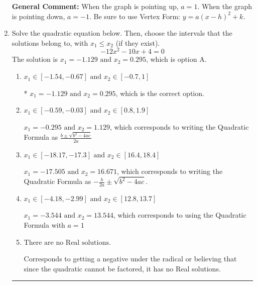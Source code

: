 \documentclass{extbook}[14pt]
\newcommand{\litem}[1]{\item #1

\rule{\textwidth}{0.4pt}}
\begin{document}
\begin{enumerate}
{\textbf{General Comment:} When the graph is pointing up, $a=1$. When the graph is pointing down, $a=-1$. Be sure to use Vertex Form: $y = a(x-h)^2+k$.
}
\litem{
Solve the quadratic equation below. Then, choose the intervals that the solutions belong to, with $x_1 \leq x_2$ (if they exist).
\[ -12x^{2} -10 x + 4 = 0 \]The solution is \( x_1 = -1.129 \text{ and } x_2 = 0.295 \), which is option A.\begin{enumerate}[label=\Alph*.]
\item \( x_1 \in [-1.54, -0.67] \text{ and } x_2 \in [-0.7, 1] \)

* $x_1 = -1.129 \text{ and } x_2 = 0.295$, which is the correct option.
\item \( x_1 \in [-0.59, -0.03] \text{ and } x_2 \in [0.8, 1.9] \)

 $x_1 = -0.295 \text{ and } x_2 = 1.129$, which corresponds to writing the Quadratic Formula as $\frac{b \pm \sqrt{b^2 - 4ac}}{2a}$
\item \( x_1 \in [-18.17, -17.3] \text{ and } x_2 \in [16.4, 18.4] \)

 $x_1 = -17.505 \text{ and } x_2 = 16.671$, which corresponds to writing the Quadratic Formula as $-\frac{b}{2a} \pm \sqrt{b^2 - 4ac}$.
\item \( x_1 \in [-4.18, -2.99] \text{ and } x_2 \in [12.8, 13.7] \)

 $x_1 = -3.544 \text{ and } x_2 = 13.544$, which corresponds to using the Quadratic Formula with $a=1$
\item \( \text{There are no Real solutions.} \)

Corresponds to getting a negative under the radical or believing that since the quadratic cannot be factored, it has no Real solutions.
\end{enumerate}

}
\end{enumerate}
\end{document}
